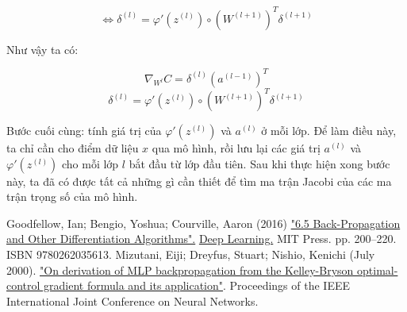 \documentclass{article}
\begin{document}
\[\Leftrightarrow \delta^{(l)} = \varphi'(z^{(l)}) \circ (W^{(l+1)})^{T}\delta^{(l+1)}\]

Như vậy ta có:

\[\nabla_{W^{l}}C = \delta^{(l)}(a^{(l-1)})^T\]
\[\delta^{(l)} = \varphi'(z^{(l)}) \circ (W^{(l+1)})^{T}\delta^{(l+1)}\]

Bước cuối cùng: tính giá trị của $\varphi'(z^{(l)})$ và $a^{(l)}$ ở mỗi lớp. Để làm điều này, ta chỉ cần cho điểm dữ liệu $x$ qua mô hình, rồi lưu lại các giá trị $a^{(l)}$ và $\varphi'(z^{(l)})$ cho mỗi lớp $l$ bắt đầu từ lớp đầu tiên. Sau khi thực hiện xong bước này, ta đã có được tất cả những gì cần thiết để tìm ma trận Jacobi của các ma trận trọng số của mô hình.

\begin{thebibliography}{2}
    Goodfellow, Ian; Bengio, Yoshua; Courville, Aaron (2016) \href{https://www.deeplearningbook.org/contents/mlp.html#pf25}{"6.5 Back-Propagation and Other Differentiation Algorithms".} \href{https://www.deeplearningbook.org/}{Deep Learning.} MIT Press. pp. 200–220. ISBN 9780262035613.
    Mizutani, Eiji; Dreyfus, Stuart; Nishio, Kenichi (July 2000). \href{https://coeieor.wpengine.com/wp-content/uploads/2019/03/ijcnn2k.pdf}{"On derivation of MLP backpropagation from the Kelley-Bryson optimal-control gradient formula and its application"}. Proceedings of the IEEE International Joint Conference on Neural Networks.
    \end{thebibliography}
\end{document}
